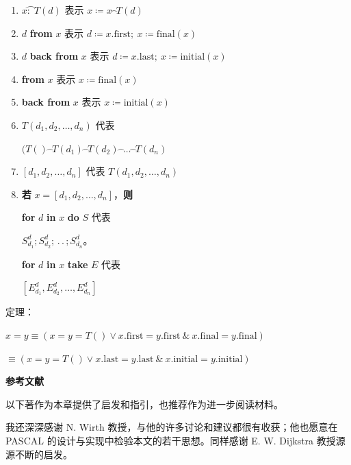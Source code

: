 \documentclass[twoside,11pt,fontset=none]{ctexbook}
\let\wideparen\overparen
\begin{document}
\begin{enumerate}[wide, nosep, label=(\arabic*)]
	\tabto*{12.6em}\& $\text{final}(x) \leqslant \text{final}(y)))$

	\noindent	
	简写：

	\item  $x\wideparen{\text{:} \ \ }T(d)$ \tabto*{11em} 表示 $x \coloneq x\wideparen{\ \ }T(d)$
	\item $d$ \textbf{from} $x$\tabto*{11em} 表示 $d\coloneq x.\text{first};\ x\coloneq \text{final}(x)$
	\item $d$ \textbf{back from} $x$\tabto*{11em} 表示 $d\coloneq x.\text{last};\ x\coloneq \text{initial}(x)$
	\item \textbf{from} $x$\tabto*{11em} 表示 $x\coloneq \text{final}(x)$
	\item \textbf{back from} $x$\tabto*{11em} 表示 $x\coloneq \text{initial}(x)$
	\item $T(d_1, d_2, \dots, d_n)$ 代表
	
	\qquad\quad $(T()\wideparen{\ \ }T(d_1)\wideparen{\ \ }T(d_2)\wideparen{\ \ }\dots\wideparen{\ \ }T(d_n)$
	
	\item $[d_1, d_2, \dots, d_n]$ 代表 $T(d_1, d_2, \dots, d_n)$
	\item \textbf{若} $x = [d_1, d_2, \dots, d_n]$，\textbf{则}
	
	\qquad \quad \textbf{for} $d$ \textbf{in} $x$ \textbf{do} $S$ 代表

	\qquad \qquad \qquad $S_{d_1}^d; S_{d_2}^d; \,.\,.\,; S_{d_n}^d$。


	\qquad \quad \textbf{for} $d$ \textbf{in} $x$ \textbf{take} $E$ 代表
	
	\qquad \qquad \qquad $[E_{d_1}^d, E_{d_2}^d, \dots, E_{d_n}^d]$

\end{enumerate}

\noindent
定理：

	\quad $x = y \equiv (x = y = T() \lor x.\text{first} = y.\text{first}\ \&\ x.\text{final} = y.\text{final})$

	\tabto*{4.9em} $\equiv (x = y = T() \lor x.\text{last} = y.\text{last}\ \&\ x.\text{initial} = y.\text{initial})$
	\bigskip

\noindent
\textbf{参考文献}
\medskip
\nopagebreak

\noindent
以下著作为本章提供了启发和指引，也推荐作为进一步阅读材料。

我还深深感谢 N. Wirth 教授，与他的许多讨论和建议都很有收获；他也愿意在 PASCAL 的设计与实现中检验本文的若干思想。同样感谢 E. W. Dijkstra 教授源源不断的启发。
\medskip
\end{document}
